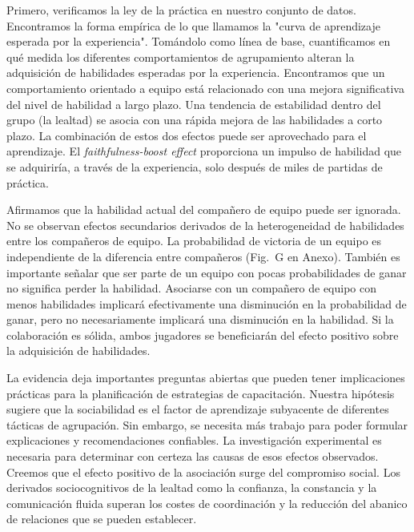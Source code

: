 \documentclass[a4paper,11pt]{book}
\theoremstyle{definition}
\begin{document}
Primero, verificamos la ley de la práctica en nuestro conjunto de datos.
%
Encontramos la forma emp\'irica de lo que llamamos la "curva de aprendizaje esperada por la experiencia".
%
Tomándolo como l\'inea de base, cuantificamos en qué medida los diferentes comportamientos de agrupamiento alteran la adquisici\'on de habilidades esperadas por la experiencia.
%
Encontramos que un comportamiento orientado a equipo está relacionado con una mejora significativa del nivel de habilidad a largo plazo.
%
Una tendencia de estabilidad dentro del grupo (la lealtad) se asocia con una rápida mejora de las habilidades a corto plazo.
%
La combinaci\'on de estos dos efectos puede ser aprovechado para el aprendizaje.
%
El \emph{faithfulness-boost effect} proporciona un impulso de habilidad que se adquirir\'ia, a través de la experiencia, solo después de miles de partidas de práctica.


Afirmamos que la habilidad actual del compañero de equipo puede ser ignorada.
%
No se observan efectos secundarios derivados de la heterogeneidad de habilidades entre los compañeros de equipo.
%
La probabilidad de victoria de un equipo es independiente de la diferencia entre compañeros (Fig.~G en Anexo).
%
También es importante señalar que ser parte de un equipo con pocas probabilidades de ganar no significa perder la habilidad.
%
Asociarse con un compañero de equipo con menos habilidades implicará efectivamente una disminuci\'on en la probabilidad de ganar, pero no necesariamente implicará una disminuci\'on en la habilidad.
%
Si la colaboraci\'on es s\'olida, ambos jugadores se beneficiarán del efecto positivo sobre la adquisici\'on de habilidades.


La evidencia deja importantes preguntas abiertas que pueden tener implicaciones prácticas para la planificaci\'on de estrategias de capacitaci\'on.
%
Nuestra hip\'otesis sugiere que la sociabilidad es el factor de aprendizaje subyacente de diferentes tácticas de agrupaci\'on.
%
Sin embargo, se necesita más trabajo para poder formular explicaciones y recomendaciones confiables.
%
La investigaci\'on experimental es necesaria para determinar con certeza las causas de esos efectos observados.
%
Creemos que el efecto positivo de la asociaci\'on surge del compromiso social.
%
Los derivados sociocognitivos de la lealtad como la confianza, la constancia y la comunicaci\'on fluida superan los costes de coordinaci\'on y la reducci\'on del abanico de relaciones que se pueden establecer.
\end{document}
